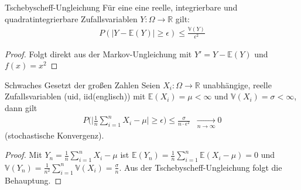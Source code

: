 \begin{Satz}{Tschebyscheff-Ungleichung }
Für eine  eine  reelle, integrierbare und quadratintegrierbare  Zufallsvariablen $Y : \Omega \to \mathbb{R}$  gilt:
\begin{align*}
P (|Y  - \mathbb{E} (Y)|  \geq \epsilon) \leq \frac{\mathbb{V} (Y)}{ \epsilon^2} 
\end{align*}
\end{Satz}
\begin{proof}
Folgt direkt aus der Markov-Ungleichung mit $Y' = Y -\mathbb{E}(Y)$ und $f(x) = x^2$
\end{proof}



\begin{Satz}{Schwaches Gesetzt der großen Zahlen }
Seien $X_i : \Omega \to \mathbb{R}$ unabhängige, reelle Zufallsvariablen (uid, iid(englisch)) mit $\mathbb{E}(X_i) = \mu < \infty$ und $\mathbb{V}(X_i) = \sigma < \infty$, dann gilt
\begin{align*}
P \bigl  ( \bigl | \frac{1}{n} \sum_{i=1}^{n} X_i - \mu \bigr |  \geq \epsilon \bigr) \leq \frac{\sigma}{ n \cdot \epsilon^2} \; \; \underset{n \to \infty}{\longrightarrow} 0
\end{align*}
(stochastische Konvergenz). 
\end{Satz}
\begin{proof}
Mit $Y_n =  \frac{1}{n} \sum_{i=1}^{n}  X_i - \mu$ ist $\mathbb{E}(Y_n) =  \frac{1}{n} \sum_{i=1}^{n} \mathbb{E}( X_i - \mu) = 0$ und 
$\mathbb{V}(Y_n) =  \frac{1}{n^2} \sum_{i=1}^{n} \mathbb{V}( X_i ) = \frac{\sigma}{n}$. Aus der Tschebyscheff-Ungleichung folgt die Behauptung.
\end{proof}



